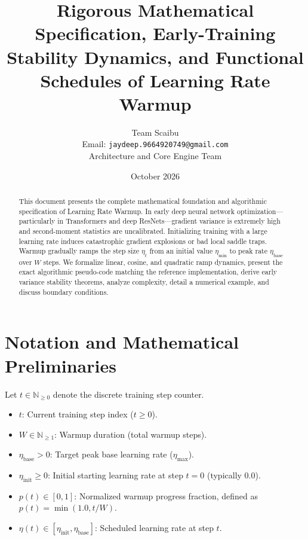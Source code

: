 \documentclass[11pt,a4paper]{article}
\title{\textbf{Rigorous Mathematical Specification, Early-Training Stability Dynamics, and Functional Schedules of Learning Rate Warmup}}
\author{Team Scaibu \\ \small Email: \texttt{jaydeep.9664920749@gmail.com} \\ \small Architecture and Core Engine Team}
\date{October 2026}
\theoremstyle{definition}
\begin{document}
\maketitle

\begin{abstract}
This document presents the complete mathematical foundation and algorithmic specification of Learning Rate Warmup. In early deep neural network optimization—particularly in Transformers and deep ResNets—gradient variance is extremely high and second-moment statistics are uncalibrated. Initializing training with a large learning rate induces catastrophic gradient explosions or bad local saddle traps. Warmup gradually ramps the step size $\eta_t$ from an initial value $\eta_{\text{min}}$ to peak rate $\eta_{\text{base}}$ over $W$ steps. We formalize linear, cosine, and quadratic ramp dynamics, present the exact algorithmic pseudo-code matching the reference implementation, derive early variance stability theorems, analyze complexity, detail a numerical example, and discuss boundary conditions.
\end{abstract}

\section{Notation and Mathematical Preliminaries}

Let $t \in \mathbb{N}_{\ge 0}$ denote the discrete training step counter.

\begin{itemize}
    \item $t$: Current training step index ($t \ge 0$).
    \item $W \in \mathbb{N}_{\ge 1}$: Warmup duration (total warmup steps).
    \item $\eta_{\text{base}} > 0$: Target peak base learning rate ($\eta_{\max}$).
    \item $\eta_{\text{init}} \ge 0$: Initial starting learning rate at step $t=0$ (typically $0.0$).
    \item $p(t) \in [0, 1]$: Normalized warmup progress fraction, defined as $p(t) = \min(1.0, t / W)$.
    \item $\eta(t) \in [\eta_{\text{init}}, \eta_{\text{base}}]$: Scheduled learning rate at step $t$.
\end{itemize}
\end{document}
